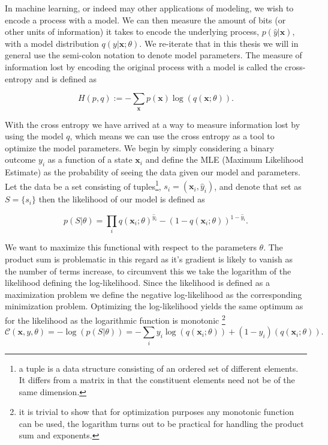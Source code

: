 In machine learning, or indeed may other applications of modeling, we wish to encode a process with a model. We can then measure the amount of bits (or other units of information) it takes to encode the underlying process, $p(\hat{y} | \mathbf{x})$, with a model distribution $q(y| \mathbf{x}; \theta)$. We re-iterate that in this thesis we will in general use the semi-colon notation to denote model parameters. The measure of information lost by encoding the original process with a model is called the cross-entropy and is defined as

\begin{equation}
H(p, q) := - \sum_\mathbf{x} p(\mathbf{x})\log(q(\mathbf{x}; \theta)).
\end{equation}

\noindent With the cross entropy we have arrived at a way to measure information lost by using the model $q$, which means we can use the cross entropy as a tool to optimize the model parameters. We begin by simply considering a binary outcome $y_i$ as a function of a state $\mathbf{x}_i$ and define the MLE (Maximum Likelihood Estimate) as the probability of seeing the data given our model and parameters. Let the data be a set consisting of tuples\footnote{a tuple is a data structure consisting of an ordered set of different elements. It differs from a matrix in that the constituent elements need not be of the same dimension.}, $s_i = (\mathbf{x}_i, \hat{y}_i)$, and denote that set as $S = \{s_i\}$ then the likelihood of our model is defined as 

\begin{equation}\label{eq:likelihood}
p(S | \theta) = \prod_i q(\mathbf{x}_i; \theta)^{\hat{y}_i} - (1-q(\mathbf{x}_i; \theta))^{1-\hat{y}_i}.
\end{equation}

\noindent We want to maximize this functional with respect to the parameters $\theta$. The product sum is problematic in this regard as it's gradient is likely to vanish as the number of terms increase, to circumvent this we take the logarithm of the likelihood defining the log-likelihood. Since the likelihood is defined as a maximization problem we define the negative log-likelihood as the corresponding minimization problem. Optimizing the log-likelihood yields the same optimum as for the likelihood as the logarithmic function is monotonic \footnote{it is trivial to show that for optimization purposes any monotonic function can be used, the logarithm turns out to be practical for handling the product sum and exponents.}
\begin{equation}\label{eq:mle}
\mathcal{C}(\mathbf{x}, y, \theta) = -\log(p(S | \theta)) = -\sum_i y_i\log(q(\mathbf{x}_i; \theta)) + (1-y_i)(q(\mathbf{x}_i; \theta)).
\end{equation}

